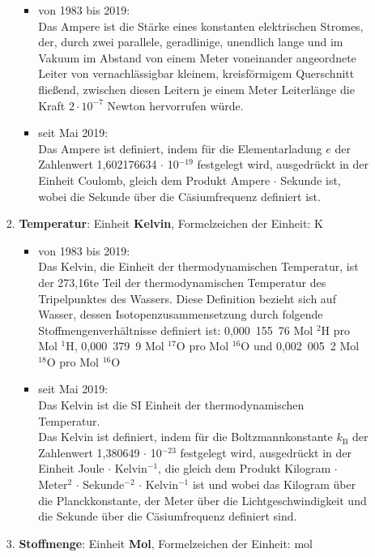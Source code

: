 \begin{raggedright}
\begin{enumerate}
\begin{itemize}
\begin{enumerate}[1.)]
			\begin{itemize}
			\item von 1983 bis 2019:\\
			Das Ampere ist die Stärke eines konstanten elektrischen
			Stromes, der, durch zwei parallele, geradlinige, unendlich lange
			und im Vakuum im Abstand von einem Meter voneinander
			angeordnete Leiter von vernachlässigbar kleinem, kreisförmigem
			Querschnitt fließend, zwischen diesen Leitern je einem Meter
			Leiterlänge die Kraft $2 \cdot 10^{-7}$ Newton hervorrufen würde.
			\item seit Mai 2019:\\
      Das Ampere ist definiert, indem für die Elementarladung
      $e$ der Zahlenwert 1,602176634 $\cdot$ 10$^{-19}$ festgelegt wird,
      ausgedrückt in der Einheit Coulomb, gleich dem
      Produkt Ampere $\cdot$ Sekunde ist,
      wobei die Sekunde über die Cäsiumfrequenz definiert ist.
			\end{itemize}
		\item \textbf{Temperatur}: Einheit \textbf{Kelvin}, Formelzeichen der Einheit: K
			\begin{itemize}
			\item von 1983 bis 2019:\\
			Das Kelvin, die Einheit der thermodynamischen Temperatur,
			ist der 273,16te Teil der thermodynamischen Temperatur des
			Tripelpunktes des Wassers. Diese Definition bezieht sich auf
			Wasser, dessen Isotopenzusammensetzung durch folgende
			Stoffmengenverhältnisse definiert ist: 0,000~155~76 Mol $^2\mathrm{H}$ pro
			Mol $^1\mathrm{H}$, 0,000~379~9 Mol $^{17}\mathrm{O}$ pro Mol $^{16}\mathrm{O}$
			und 0,002~005~2 Mol $^{18}\mathrm{O}$ pro Mol $^{16}\mathrm{O}$
			\item seit Mai 2019:\\
      Das Kelvin ist die SI Einheit der thermodynamischen Temperatur.\\
      Das Kelvin ist definiert, indem für die Boltzmannkonstante $k_\mathrm{B}$
      der Zahlenwert 1,380649 $\cdot$ 10$^{-23}$ festgelegt wird, ausgedrückt in der
      Einheit Joule $\cdot$ Kelvin$^{-1}$, die gleich dem Produkt
      Kilogram $\cdot$ Meter$^2$ $\cdot$ Sekunde$^{-2}$ $\cdot$ Kelvin$^{-1}$ ist und
      wobei das Kilogram über die Planckkonstante, der Meter über die
      Lichtgeschwindigkeit und die Sekunde über die Cäsiumfrequenz definiert sind.
			\end{itemize}
		\item \textbf{Stoffmenge}: Einheit \textbf{Mol}, Formelzeichen der Einheit: mol

\end{enumerate}
\end{itemize}
\end{enumerate}
\end{raggedright}
